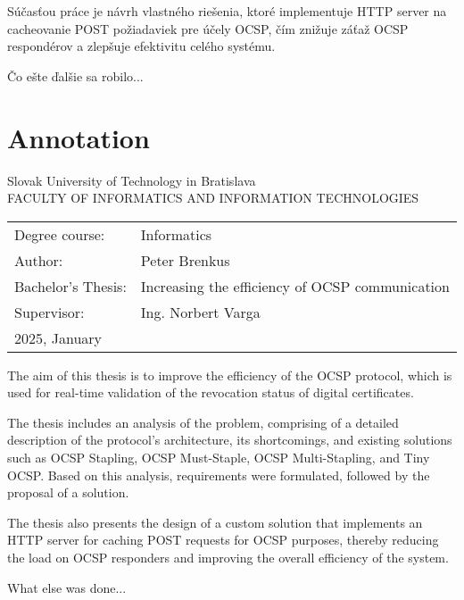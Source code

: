 \documentclass[12pt, twoside]{book}
\def\mferok{2025, January}
\def\mfenazov{Increasing the efficiency of OCSP communication}
\def\mfautor{Peter Brenkus}
\def\mfeveduci{Ing. Norbert Varga}
\begin{document}
Súčasťou práce je návrh vlastného riešenia, ktoré implementuje HTTP server na cacheovanie POST požiadaviek pre účely OCSP, čím znižuje záťaž OCSP respondérov a zlepšuje efektivitu celého systému.

Čo ešte ďalšie sa robilo...

\newpage\null\thispagestyle{empty}\newpage



\newpage
\thispagestyle{empty}
 
\section*{Annotation}
\noindent
Slovak University of Technology in Bratislava\\
FACULTY OF INFORMATICS AND INFORMATION TECHNOLOGIES\\

\begin{tabular}{@{}ll}
Degree course: & Informatics\bigskip
\bigskip  \\
Author: & \mfautor \\
Bachelor’s Thesis: & \mfenazov \\
Supervisor: & \mfeveduci \\
\mferok
\end{tabular}

\bigskip
\bigskip 
\bigskip 
\noindent

The aim of this thesis is to improve the efficiency of the OCSP protocol, which is used for real-time validation of the revocation status of digital certificates.

The thesis includes an analysis of the problem, comprising of a detailed description of the protocol’s architecture, its shortcomings, and existing solutions such as OCSP Stapling, OCSP Must-Staple, OCSP Multi-Stapling, and Tiny OCSP. Based on this analysis, requirements were formulated, followed by the proposal of a solution.

The thesis also presents the design of a custom solution that implements an HTTP server for caching POST requests for OCSP purposes, thereby reducing the load on OCSP responders and improving the overall efficiency of the system.


What else was done... 
 
\newpage\null\thispagestyle{empty}\newpage

\end{document}
